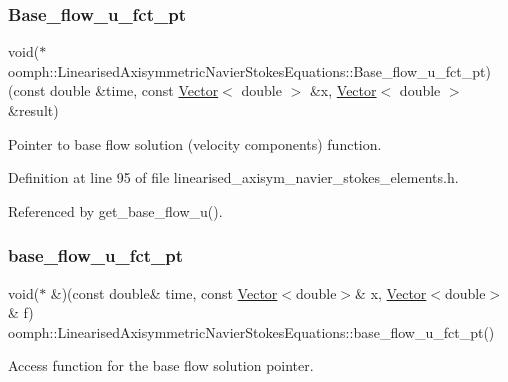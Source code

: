 \subsubsection{\texorpdfstring{Base\+\_\+flow\+\_\+u\+\_\+fct\+\_\+pt}{Base\_flow\_u\_fct\_pt}}
{\footnotesize\ttfamily void($\ast$ oomph\+::\+Linearised\+Axisymmetric\+Navier\+Stokes\+Equations\+::\+Base\+\_\+flow\+\_\+u\+\_\+fct\+\_\+pt) (const double \&time, const \hyperlink{classoomph_1_1Vector}{Vector}$<$ double $>$ \&x, \hyperlink{classoomph_1_1Vector}{Vector}$<$ double $>$ \&result)\hspace{0.3cm}{\ttfamily [protected]}}



Pointer to base flow solution (velocity components) function. 



Definition at line 95 of file linearised\+\_\+axisym\+\_\+navier\+\_\+stokes\+\_\+elements.\+h.



Referenced by get\+\_\+base\+\_\+flow\+\_\+u().

\mbox{\label{classoomph_1_1LinearisedAxisymmetricNavierStokesEquations_a6af773978aa51ff94bf1b8d110dcbb9c}} 
\subsubsection{\texorpdfstring{base\+\_\+flow\+\_\+u\+\_\+fct\+\_\+pt}{base\_flow\_u\_fct\_pt}}
{\footnotesize\ttfamily void($\ast$ \&)(const double\& time, const \hyperlink{classoomph_1_1Vector}{Vector}$<$double$>$\& x, \hyperlink{classoomph_1_1Vector}{Vector}$<$double$>$\& f) oomph\+::\+Linearised\+Axisymmetric\+Navier\+Stokes\+Equations\+::base\+\_\+flow\+\_\+u\+\_\+fct\+\_\+pt()\hspace{0.3cm}{\ttfamily [inline]}}



Access function for the base flow solution pointer. 



